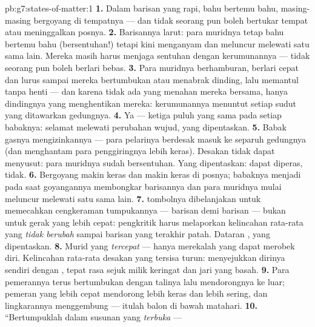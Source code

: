 \begin{solution}{pb:g7:states-of-matter:1}
\textbf{1.} Dalam barisan yang rapi, bahu bertemu bahu, masing-masing
bergoyang di tempatnya --- dan tidak seorang pun boleh bertukar tempat
atau meninggalkan posnya.
\textbf{2.} Barisannya larut: para muridnya tetap bahu bertemu bahu
(bersentuhan!) tetapi kini menganyam dan meluncur melewati satu sama
lain. Mereka masih harus menjaga sentuhan dengan kerumunannya ---
tidak seorang pun boleh berlari bebas.
\textbf{3.} Para muridnya berhamburan, berlari cepat dan lurus sampai
mereka bertumbukan atau menabrak dinding, lalu memantul tanpa
henti --- dan karena tidak ada yang menahan mereka bersama, hanya
dindingnya yang menghentikan mereka: kerumunannya menuntut setiap
sudut yang ditawarkan gedungnya.
\textbf{4.} Ya --- ketiga puluh yang sama pada setiap babaknya: 
selamat melewati perubahan wujud, yang dipentaskan.
\textbf{5.} Babak gasnya mengizinkannya --- para pelarinya berdesak
masuk ke separuh gedungnya (dan menghantam para penggiringnya lebih
keras). Desakan  tidak dapat menyusut: para muridnya sudah
bersentuhan. Yang dipentaskan:  dapat diperas,  tidak.
\textbf{6.} Bergoyang makin keras dan makin keras di posnya;
babaknya menjadi  pada saat goyangannya membongkar barisannya
dan para muridnya mulai meluncur melewati satu sama lain.
\textbf{7.}  tombolnya dibelanjakan untuk memecahkan cengkeraman
tumpukannya --- barisan demi barisan --- bukan untuk gerak yang lebih
cepat: pengkritik  harus melaporkan kelincahan rata-rata
yang \emph{tidak berubah} sampai barisan yang terakhir patah. Dataran
, yang dipentaskan.
\textbf{8.} Murid yang \emph{tercepat} --- hanya merekalah yang dapat
merobek diri. Kelincahan rata-rata desakan yang tersisa turun:  menyejukkan dirinya sendiri dengan , tepat rasa sejuk
milik keringat dan jari yang basah.
\textbf{9.} Para pemerannya terus bertumbukan dengan talinya lalu
mendorongnya ke luar; pemeran yang lebih cepat mendorong lebih keras
dan lebih sering, dan lingkarannya menggembung --- itulah balon di
bawah matahari.
\textbf{10.} ``Bertumpuklah dalam susunan yang \emph{terbuka} ---

\end{solution}
